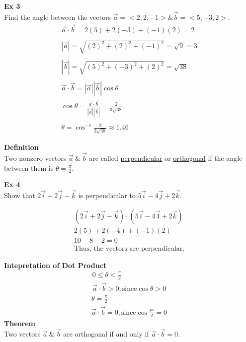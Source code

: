 \documentclass{article}
\begin{document}
  \textbf{Ex 3}\\
  Find the angle between the vectors $ \vec{a} = < 2, 2, -1> \& \vec{b}=< 5, -3, 2> $.
  \[
    \begin{gathered}
    \vec{a} \cdot  \vec{b} = 2(5)+2(-3)+(-1)(2)=2\\
    ~\\
    | \vec{a} | = \sqrt{(2)^{2} + (2)^{2} + (-1)^{2}} = \sqrt{9} = 3\\
    ~\\
    | \vec{b} | = \sqrt{(5)^{2}+(-3)^{2} + (2)^{2}   } = \sqrt{38}\\
    ~\\
    \vec{a} \cdot \vec{b}=| \vec{a} | | \vec{b} | \cos{\theta}\\
    \cos{\theta}= \frac{\vec{a}\cdot \vec{b}}{| \vec{a} || \vec{b} |}= \frac{2}{3\sqrt{38} } \\
    ~\\
    \theta=\cos^{-1}{\frac{2}{3\sqrt{38} }}\approx \boxed{1.46}
    \end{gathered}
  \]

  \textbf{Definition}\\
  Two nonzero vectors $ \vec{a} ~\& ~\vec{b} $ are called \underline{perpendicular} or \underline{orthogonal} if the angle between them is $ \theta=\frac{\pi}{2} $.
  
  \textbf{Ex 4}\\
  Show that $ 2\vec{i}+2\vec{j}-\vec{k} $ is perpendicular to $ 5\vec{i}-4\vec{j}+2\vec{k} $.
  
  \[
    \begin{gathered}
      (2\vec{i}+2\vec{j}-\vec{k}) \cdot (5\vec{i}-4\vec{4}+2\vec{k})\\
      2(5) + 2(-4) + (-1)(2)\\
      10-8-2=0\\
      \text{Thus, the vectors are perpendicular.}
    \end{gathered}
  \]

  \textbf{Intepretation of Dot Product}
  \[
    \begin{gathered}  
  0\le\theta<\frac{\pi}{2}\\
  \vec{a}\cdot \vec{b}>0, \text{since} \cos{\theta}>0  
    \end{gathered}
  \]
  \[
    \begin{gathered}
    \theta=\frac{\pi}{2} \\
    \vec{a}\cdot \vec{b}=0, \text{since} \cos{\frac{pi}{2}=0 }
    \end{gathered}
  \]
  \textbf{Theorem}\\
  Two vectors $ \vec{a} ~\& ~\vec{b} $ are orthogonal if and only if $ \vec{a} \cdot \vec{b} = 0$. 
\end{document}
